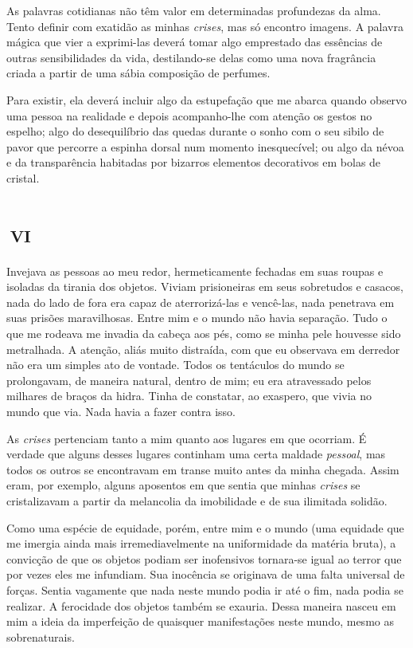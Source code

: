 As palavras cotidianas não têm valor em determinadas profundezas da alma. Tento definir com exatidão as minhas \textit{crises}, mas só encontro imagens. A palavra mágica que vier a exprimi-las deverá tomar algo emprestado das essências de outras sensibilidades da vida, destilando-se delas como uma nova fragrância criada a partir de uma sábia composição de perfumes.

Para existir, ela deverá incluir algo da estupefação que me abarca quando observo uma pessoa na realidade e depois acompanho-lhe com atenção os gestos no espelho; algo do desequilíbrio das quedas durante o sonho com o seu sibilo de pavor que percorre a espinha dorsal num momento inesquecível; ou algo da névoa e da transparência habitadas por bizarros elementos decorativos em bolas de cristal.


\chapter*{\small{}\,\Large\centering\textsc{vi}\,\small{}}

Invejava as pessoas ao meu redor, hermeticamente fechadas em suas roupas e isoladas da tirania dos objetos. Viviam prisioneiras em seus sobretudos e casacos, nada do lado de fora era capaz de aterrorizá-las e vencê-las, nada penetrava em suas prisões maravilhosas. Entre mim e o mundo não havia separação. Tudo o que me rodeava me invadia da cabeça aos pés, como se minha pele houvesse sido metralhada. A atenção, aliás muito distraída, com que eu observava em derredor não era um simples ato de vontade. Todos os tentáculos do mundo se prolongavam, de maneira natural, dentro de mim; eu era atravessado pelos milhares de braços da hidra. Tinha de constatar, ao exaspero, que vivia no mundo que via. Nada havia a fazer contra isso.

As \textit{crises} pertenciam tanto a mim quanto aos lugares em que ocorriam. É verdade que alguns desses lugares continham uma certa maldade \textit{pessoal}, mas todos os outros se encontravam em transe muito antes da minha chegada. Assim eram, por exemplo, alguns aposentos em que sentia que minhas \textit{crises} se cristalizavam a partir da melancolia da imobilidade e de sua ilimitada solidão.

Como uma espécie de equidade, porém, entre mim e o mundo (uma equidade que me imergia ainda mais irremediavelmente na uniformidade da matéria bruta), a convicção de que os objetos podiam ser inofensivos tornara-se igual ao terror que por vezes eles me infundiam. Sua inocência se originava de uma falta universal de forças.
Sentia vagamente que nada neste mundo podia ir até o fim, nada podia se realizar. A ferocidade dos objetos também se exauria. Dessa maneira nasceu em mim a ideia da imperfeição de quaisquer manifestações neste mundo, mesmo as sobrenaturais. 

